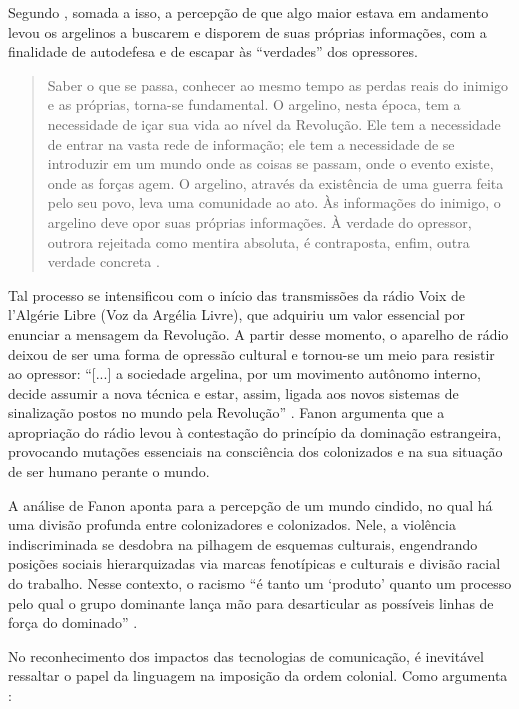 \documentclass[portuguese]{textolivre}
\begin{document}
Segundo \textcite{fanon2021argelia}, somada a isso, a percepção de que algo maior estava em andamento levou os argelinos a buscarem e disporem de suas próprias informações, com a finalidade de autodefesa e de escapar às “verdades” dos opressores.

\begin{quote}
    Saber o que se passa, conhecer ao mesmo tempo as perdas reais do inimigo e as próprias, torna-se fundamental. O argelino, nesta época, tem a necessidade de içar sua vida ao nível da Revolução. Ele tem a necessidade de entrar na vasta rede de informação; ele tem a necessidade de se introduzir em um mundo onde as coisas se passam, onde o evento existe, onde as forças agem. O argelino, através da existência de uma guerra feita pelo seu povo, leva uma comunidade ao ato. Às informações do inimigo, o argelino deve opor suas próprias informações. À verdade do opressor, outrora rejeitada como mentira absoluta, é contraposta, enfim, outra verdade concreta \cite[p. 682]{fanon2021argelia}.
\end{quote}

Tal processo se intensificou com o início das transmissões da rádio Voix de l’Algérie Libre (Voz da Argélia Livre), que adquiriu um valor essencial por enunciar a mensagem da Revolução. A partir desse momento, o aparelho de rádio deixou de ser uma forma de opressão cultural e tornou-se um meio para resistir ao opressor: “[...] a sociedade argelina, por um movimento autônomo interno, decide assumir a nova técnica e estar, assim, ligada aos novos sistemas de sinalização postos no mundo pela Revolução” \cite[p. 687]{fanon2021argelia}. Fanon argumenta que a apropriação do rádio levou à contestação do princípio da dominação estrangeira, provocando mutações essenciais na consciência dos colonizados e na sua situação de ser humano perante o mundo.

A análise de Fanon aponta para a percepção de um mundo cindido, no qual há uma divisão profunda entre colonizadores e colonizados. Nele, a violência indiscriminada se desdobra na pilhagem de esquemas culturais, engendrando posições sociais hierarquizadas via marcas fenotípicas e culturais e divisão racial do trabalho. Nesse contexto, o racismo “é tanto um ‘produto’ quanto um processo pelo qual o grupo dominante lança mão para desarticular as possíveis linhas de força do dominado” \cite[p. 153]{faustino2018fanon}.

No reconhecimento dos impactos das tecnologias de comunicação, é inevitável ressaltar o papel da linguagem na imposição da ordem colonial. Como argumenta \textcite[p. 680]{fanon2021argelia}:
\end{document}
